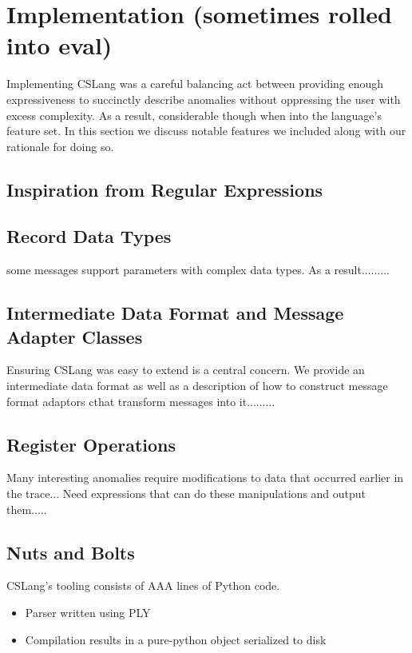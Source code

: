 \section{Implementation (sometimes rolled into eval)}
\label{SEC:implementation}

Implementing CSLang was a careful balancing act between providing enough
expressiveness to succinctly describe anomalies without oppressing the user
with excess complexity.  As a result, considerable though when into the
language's feature set.  In this section we discuss notable features we
included along with our rationale for doing so.

\subsection{Inspiration from Regular Expressions}


\subsection{Record Data Types}

some messages support parameters with complex data types.  As a
result.........

\subsection{Intermediate Data Format and Message Adapter Classes}

Ensuring CSLang was easy to extend is a central concern.  We provide an
intermediate data format as well as a description of how to construct
message format adaptors cthat transform messages into it.........

\subsection{Register Operations}

Many interesting anomalies require modifications to data that occurred
earlier in the trace...  Need expressions that can do these manipulations
and output them.....


\subsection{Nuts and Bolts}
CSLang's tooling consists of AAA lines of Python code.
\begin{itemize}
\item{Parser written using PLY}
\item{Compilation results in a pure-python object serialized to disk}
\end{itemize}

